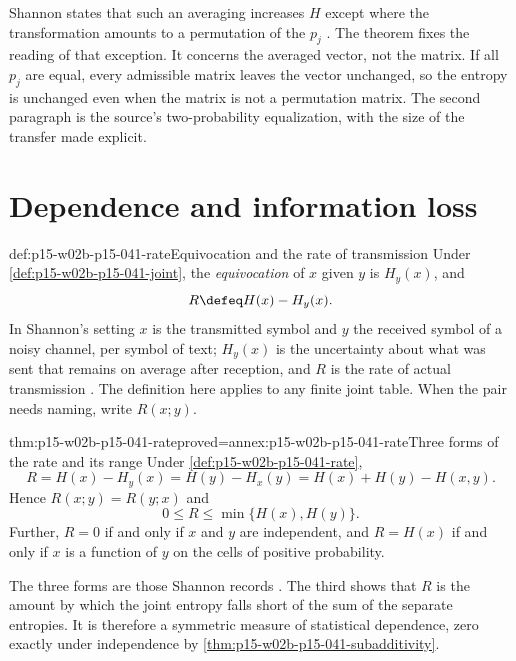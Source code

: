 Shannon states that such an averaging increases \(H\) except where the
transformation amounts to a permutation of the \(p_j\)
\cite[p.~12]{Shannon1948MathematicalTheory}. The theorem fixes the
reading of that exception. It concerns the averaged vector, not the
matrix. If all \(p_j\) are equal, every admissible matrix leaves the
vector unchanged, so the entropy is unchanged even when the matrix is
not a permutation matrix. The second paragraph is the source's
two-probability equalization, with the size of the transfer made
explicit.

\section{Dependence and information loss}
\label{sec:p15-w02b-p15-041-dependence}

\begin{hbdefinition}{def:p15-w02b-p15-041-rate}{Equivocation and the rate of transmission}
Under \cref{def:p15-w02b-p15-041-joint}, the \emph{equivocation} of
\(x\) given \(y\) is \(H_y(x)\), and
\[
 R\defeq H(x)-H_y(x).
\]
In Shannon's setting \(x\) is the transmitted symbol and \(y\) the
received symbol of a noisy channel, per symbol of text; \(H_y(x)\) is
the uncertainty about what was sent that remains on average after
reception, and \(R\) is the rate of actual transmission
\cite[p.~20]{Shannon1948MathematicalTheory}. The definition here applies
to any finite joint table. When the pair needs naming, write
\(R(x;y)\).
\end{hbdefinition}

\begin{hbtheorem}{thm:p15-w02b-p15-041-rate}{proved=annex:p15-w02b-p15-041-rate}{Three forms of the rate and its range}
Under \cref{def:p15-w02b-p15-041-rate},
\[
 R=H(x)-H_y(x)=H(y)-H_x(y)=H(x)+H(y)-H(x,y).
\]
Hence \(R(x;y)=R(y;x)\) and
\[
 0\leq R\leq\min\{H(x),H(y)\}.
\]
Further, \(R=0\) if and only if \(x\) and \(y\) are independent, and
\(R=H(x)\) if and only if \(x\) is a function of \(y\) on the cells of
positive probability.
\end{hbtheorem}

The three forms are those Shannon records
\cite[p.~21]{Shannon1948MathematicalTheory}. The third shows that \(R\)
is the amount by which the joint entropy falls short of the sum of the
separate entropies. It is therefore a symmetric measure of statistical
dependence, zero exactly under independence by
\cref{thm:p15-w02b-p15-041-subadditivity}.

